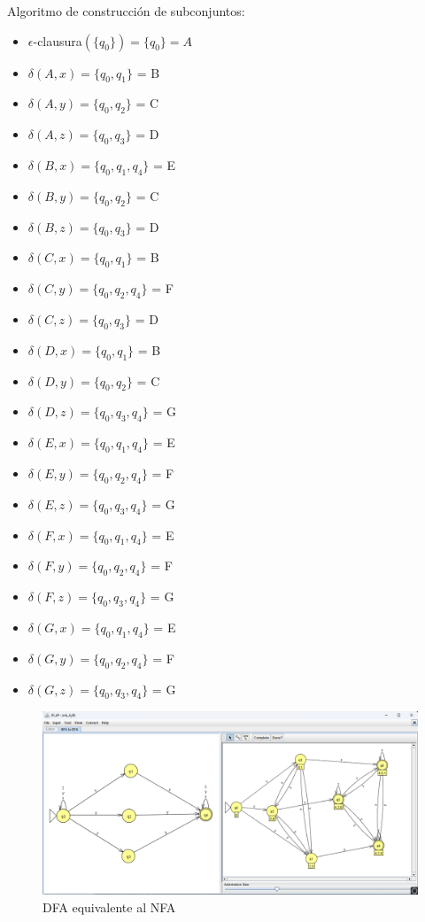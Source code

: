 \documentclass[11pt]{report}
\begin{document}
\newpage

Algoritmo de construcción de subconjuntos:
\begin{multicols}{2}
  \begin{itemize}
    \item $\epsilon$-clausura$(\{q_0\}) = \{q_0\} = A$
    \item $\delta(A, x) = \{q_0, q_1\}$ = B
    \item $\delta(A, y) = \{q_0, q_2\}$ = C
    \item $\delta(A, z) = \{q_0, q_3\}$ = D
    \item $\delta(B, x) = \{q_0, q_1, q_4\}$ = E
    \item $\delta(B, y) = \{q_0, q_2\}$ = C
    \item $\delta(B, z) = \{q_0, q_3\}$ = D
    \item $\delta(C, x) = \{q_0, q_1\}$ = B
    \item $\delta(C, y) = \{q_0, q_2, q_4\}$ = F
    \item $\delta(C, z) = \{q_0, q_3\}$ = D
    \item $\delta(D, x) = \{q_0, q_1\}$ = B
  \end{itemize}
  
  \columnbreak

  \begin{itemize}
    \item $\delta(D, y) = \{q_0, q_2\}$ = C
    \item $\delta(D, z) = \{q_0, q_3, q_4\}$ = G
    \item $\delta(E, x) = \{q_0, q_1, q_4\}$ = E
    \item $\delta(E, y) = \{q_0, q_2, q_4\}$ = F
    \item $\delta(E, z) = \{q_0, q_3, q_4\}$ = G
    \item $\delta(F, x) = \{q_0, q_1, q_4\}$ = E
    \item $\delta(F, y) = \{q_0, q_2, q_4\}$ = F
    \item $\delta(F, z) = \{q_0, q_3, q_4\}$ = G
    \item $\delta(G, x) = \{q_0, q_1, q_4\}$ = E
    \item $\delta(G, y) = \{q_0, q_2, q_4\}$ = F
    \item $\delta(G, z) = \{q_0, q_3, q_4\}$ = G
  \end{itemize}
\end{multicols}

\begin{figure}[H]
  \centering
  \includegraphics[scale=0.45]{img/NFA_to_DFA_06.png}
  \caption{DFA equivalente al NFA}
\end{figure}
\end{document}

